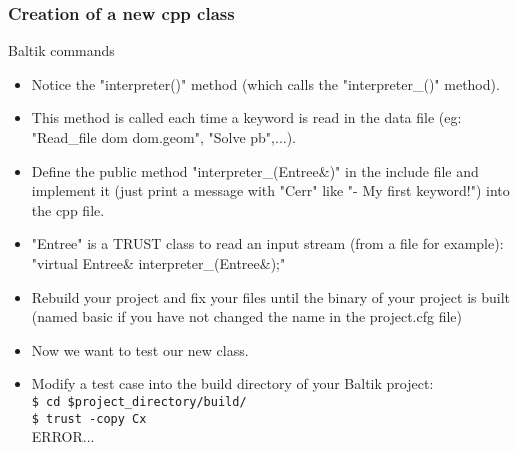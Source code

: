 \documentclass[10pt, hyperref={unicode=true,pdfusetitle, bookmarks=true,bookmarksnumbered=false,bookmarksopen=false, breaklinks=false,pdfborder={0 0 1},backref=true,colorlinks=true,linkcolor=darkblue,pageanchor, urlcolor=darkblue}]{beamer}
\begin{document}
\begin{frame}
\frametitle{Creation of a new cpp class}
\begin{block}{Baltik commands}

\begin{itemize}
\item Notice the "interpreter()" method (which calls the "interpreter\_()" method).

\item This method is called each time a keyword is read in the data file (eg: "Read\_file dom dom.geom", "Solve pb",...).

\item Define the public method "interpreter\_(Entree\&)" in the include file and implement it
(just print a message with "Cerr" like "- My first keyword!") into the cpp file. 

\item "Entree" is a TRUST class to read an input stream (from a file for example):\\
"virtual Entree\& interpreter\_(Entree\&);"

\item Rebuild your project and fix your files until the binary of your project is built (named
basic if you have not changed the name in the project.cfg file)\\

\item Now we want to test our new class.

\item Modify a test case into the build directory of your Baltik project:\\
\texttt{\$ cd \$project\_directory/build/}\\
\texttt{\$ trust -copy Cx}\\
ERROR...
\end{itemize}

\end{block}
\end{frame}
\end{document}
